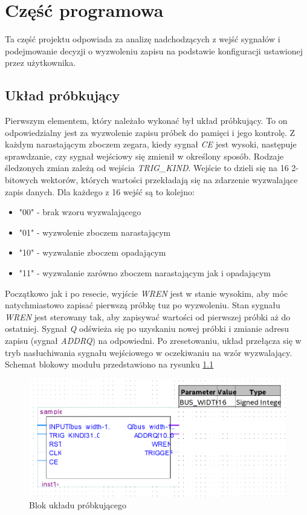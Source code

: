 \chapter{Część programowa}

Ta część projektu odpowiada za analizę nadchodzących z wejść sygnałów i podejmowanie decyzji o wyzwoleniu zapisu na podstawie konfiguracji ustawionej przez użytkownika. 


\section{Układ próbkujący}
	Pierwszym elementem, który należało wykonać był układ próbkujący. To on odpowiedzialny jest za wyzwolenie zapisu próbek do pamięci i jego kontrolę. Z każdym narastającym zboczem zegara, kiedy sygnał \emph{CE} jest wysoki, następuje sprawdzanie, czy sygnał wejściowy się zmienił w określony sposób. Rodzaje śledzonych zmian zależą od wejścia \emph{TRIG\_KIND}. Wejście to dzieli się na 16 2-bitowych wektorów, których wartości przekładają się na zdarzenie wyzwalające zapis danych. Dla każdego z 16 wejść są to kolejno:
	
	\begin{itemize}
		\item "00" - brak wzoru wyzwalającego
		\item "01" - wyzwolenie zboczem narastającym
		\item "10" - wyzwalanie zboczem opadającym
		\item "11" - wyzwalanie zarówno zboczem narastającym jak i opadającym
	\end{itemize}
	
Początkowo jak i po resecie, wyjście \emph{WREN} jest w stanie wysokim, aby móc natychmiastowo zapisać pierwszą próbkę tuz po wyzwoleniu. Stan sygnału \emph{WREN} jest sterowany tak, aby zapisywać wartości od pierwszej próbki aż do ostatniej. Sygnał \emph{Q} odświeża się po uzyskaniu nowej próbki i zmianie adresu zapisu (sygnał \emph{ADDRQ}) na odpowiedni.
Po zresetowaniu, układ przełącza się w tryb nasłuchiwania sygnału wejściowego w oczekiwaniu na wzór wyzwalający.
Schemat blokowy modułu przedstawiono na rysunku \ref{sampler_block_diagram}

\begin{figure}[H]
	\centering
	\includegraphics[width = 0.4 \paperwidth]{images/sampler_block_diagram.png}
	\caption{Blok układu próbkującego}
	\label{sampler_block_diagram}
\end{figure}
	
